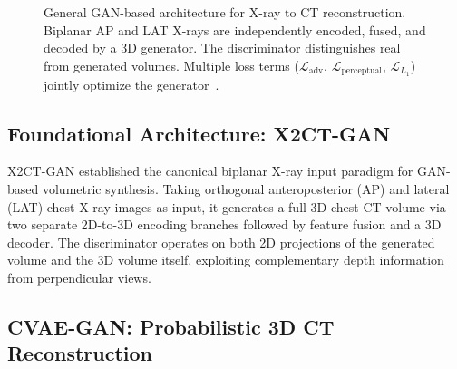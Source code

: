 \documentclass[10pt,twocolumn,a4paper]{article}
\begin{document}
\begin{figure}[t]
\caption{General GAN-based architecture for X-ray to CT reconstruction.
Biplanar AP and LAT X-rays are independently encoded, fused, and decoded by a
3D generator. The discriminator distinguishes real from generated volumes.
Multiple loss terms ($\mathcal{L}_\text{adv}$, $\mathcal{L}_\text{perceptual}$,
$\mathcal{L}_{L_1}$) jointly optimize the generator~\cite{x2ctgan,trctgan}.}
\label{fig:gan_overview}
\end{figure}

\subsection{Foundational Architecture: X2CT-GAN}
\label{sec:gan:x2ct}

X2CT-GAN established the canonical biplanar X-ray input paradigm for
GAN-based volumetric synthesis. Taking orthogonal anteroposterior (AP) and
lateral (LAT) chest X-ray images as input, it generates a full 3D chest CT
volume via two separate 2D-to-3D encoding branches followed by feature fusion
and a 3D decoder. The discriminator operates on both 2D projections of the
generated volume and the 3D volume itself, exploiting complementary depth
information from perpendicular views.

\subsection{CVAE-GAN: Probabilistic 3D CT Reconstruction}
\label{sec:gan:cvae}
\end{document}
